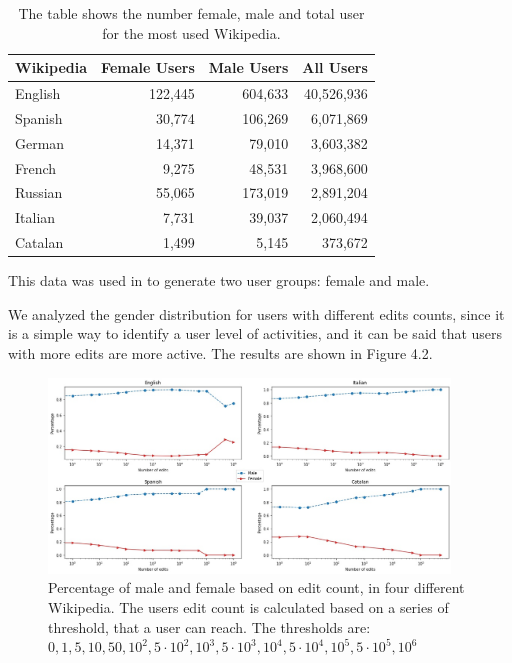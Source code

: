 \begin{table}[H]
    \centering
    \begin{tabularx}{\columnwidth}{@{}Xrrr@{}}
        \midrule
        \textbf{Wikipedia} & \textbf{Female Users} & \textbf{Male Users} & \textbf{All Users} \\ \toprule
        English & 122,445 & 604,633 & 40,526,936  \\
        Spanish & 30,774 & 106,269 & 6,071,869  \\
        German & 14,371 & 79,010 & 3,603,382 \\
        French & 9,275 & 48,531 & 3,968,600 \\
        Russian & 55,065 & 173,019 & 2,891,204 \\
        Italian & 7,731 & 39,037 & 2,060,494  \\
        Catalan & 1,499 & 5,145 & 373,672  \\

         \bottomrule
    \end{tabularx}
    
    \caption{The table shows the number female, male and total user for the most used Wikipedia. \label{table:datasetsize}}
\end{table}

This data was used in to generate two user groups: female and male.

We analyzed the gender distribution for users with different edits counts, since it is a simple way to identify a user level of activities, and it can be said that users with more edits are more active. The results are shown in Figure 4.2.

\begin{figure}[H]
    \centering
    \includegraphics[width=0.95\textwidth]{./img/gedit.jpg}
    \caption{Percentage of male and female based on edit count, in four different Wikipedia. The users edit count is calculated based on a series of threshold, that a user can reach. The thresholds are: $0, 1, 5, 10, 50, 10^2, 5 \cdot 10^2, 10^3, 5 \cdot 10^3, 10^4, 5 \cdot 10^4, 10^5, 5 \cdot 10^5, 10^6$  }
    \label{fig:gedit}
\end{figure}

